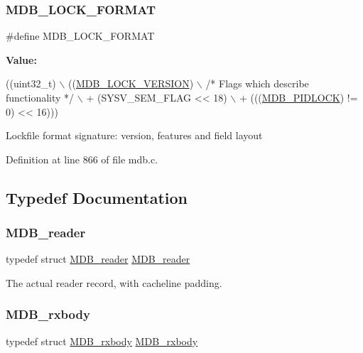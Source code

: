 \subsubsection{\texorpdfstring{M\+D\+B\+\_\+\+L\+O\+C\+K\+\_\+\+F\+O\+R\+M\+AT}{MDB\_LOCK\_FORMAT}}
{\footnotesize\ttfamily \#define M\+D\+B\+\_\+\+L\+O\+C\+K\+\_\+\+F\+O\+R\+M\+AT}

{\bfseries Value\+:}
\begin{DoxyCode}
((uint32\_t) \(\backslash\)
     ((\mbox{\hyperlink{group__internal_ga1d56e55199f31cd585300a2b73c22d82}{MDB\_LOCK\_VERSION}}) \(\backslash\)
      \textcolor{comment}{/* Flags which describe functionality */} \(\backslash\)
      + (SYSV\_SEM\_FLAG << 18) \(\backslash\)
      + (((\mbox{\hyperlink{group__compat_ga074373701b95aeaf38530ad7f9970030}{MDB\_PIDLOCK}}) != 0) << 16)))
\end{DoxyCode}
Lockfile format signature\+: version, features and field layout 

Definition at line 866 of file mdb.\+c.



\subsection{Typedef Documentation}
\mbox{\label{group__readers_gad3ac1f5bf85920df3818e91fe9031493}} 
\subsubsection{\texorpdfstring{M\+D\+B\+\_\+reader}{MDB\_reader}}
{\footnotesize\ttfamily typedef struct \mbox{\hyperlink{struct_m_d_b__reader}{M\+D\+B\+\_\+reader}}  \mbox{\hyperlink{struct_m_d_b__reader}{M\+D\+B\+\_\+reader}}}

The actual reader record, with cacheline padding. \mbox{\label{group__readers_ga441ab38871fdc5337aa8d65774c0836d}} 
\subsubsection{\texorpdfstring{M\+D\+B\+\_\+rxbody}{MDB\_rxbody}}
{\footnotesize\ttfamily typedef struct \mbox{\hyperlink{struct_m_d_b__rxbody}{M\+D\+B\+\_\+rxbody}}  \mbox{\hyperlink{struct_m_d_b__rxbody}{M\+D\+B\+\_\+rxbody}}}

